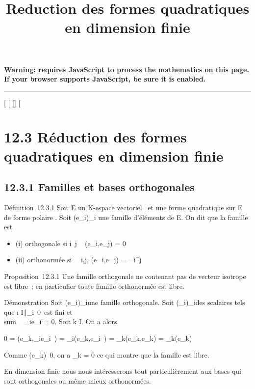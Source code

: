 \documentclass[]{article}
\title{Reduction des formes quadratiques en dimension finie}
\author{}
\date{}
\begin{document}
\maketitle

\textbf{Warning: 
requires JavaScript to process the mathematics on this page.\\ If your
browser supports JavaScript, be sure it is enabled.}

\begin{center}\rule{3in}{0.4pt}\end{center}

[
[
[]
[

\section{12.3 Réduction des formes quadratiques en dimension
finie}

\subsection{12.3.1 Familles et bases orthogonales}

Définition~12.3.1 Soit E un K-espace vectoriel ~et \Phi une forme
quadratique sur E de forme polaire \phi. Soit (e_i)_i\inI
une famille d'éléments de E. On dit que la famille est

\begin{itemize}
\itemsep1pt\parskip0pt
\item
  (i) orthogonale si i\neq~j \rigtharrow~
  \phi(e_i,e_j) = 0
\item
  (ii) orthonormée si \forall~~i,j,
  \phi(e_i,e_j) = \delta_i^j
\end{itemize}

Proposition~12.3.1 Une famille orthogonale ne contenant pas de vecteur
isotrope est libre~; en particulier toute famille orthonormée est libre.

Démonstration Soit (e_i)_i\inI une famille orthogonale.
Soit (\lambda_i)_i\inI des scalaires tels que
\i \in
I∣\lambda_i\mathrel\neq~0\
est fini et \\sum ~
\lambda_ie_i = 0. Soit k \in I. On a alors

0 = \phi(e_k,\sum \lambda_ie_i~)
= \sum \lambda_i\phi(e_k,e_i~) =
\lambda_k\phi(e_k,e_k) = \lambda_k\Phi(e_k)

Comme \Phi(e_k)\neq~0, on a \lambda_k =
0 ce qui montre que la famille est libre.

En dimension finie nous nous intéresserons tout particulièrement aux
bases qui sont orthogonales ou même mieux orthonormées.
\end{document}
